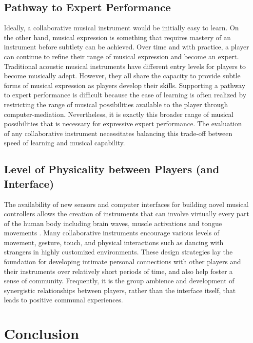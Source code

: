 \subsection{Pathway to Expert Performance}

Ideally, a collaborative musical instrument would be initially easy to learn. On
the other hand, musical expression is something that requires mastery of an
instrument before subtlety can be achieved. Over time and with practice, a player
can continue to refine their range of musical expression and become an expert. 
Traditional acoustic musical instruments  have different entry levels for players
to become musically adept.  However, they all share the capacity to provide
subtle forms of musical expression as players develop their skills. Supporting a
pathway to expert performance is difficult because the ease of learning is often
realized by restricting the range of musical possibilities available to the
player through computer-mediation.  Nevertheless, it is exactly this broader
range of musical possibilities that is necessary for expressive expert
performance. The evaluation of any collaborative instrument necessitates
balancing this trade-off between speed of learning and musical capability.

\subsection{Level of Physicality between Players (and Interface)}

The availability of new sensors and computer interfaces for building novel
musical controllers allows the creation of instruments that can involve virtually
every part of the human body including brain waves, muscle activations \cite{Tanaka:2002} and
tongue movements \cite{Vogt:2002}.  Many collaborative instruments encourage various levels
of movement, gesture, touch, and physical interactions such as dancing with
strangers in highly customized environments. These design strategies lay the
foundation for developing intimate personal connections with other players and
their instruments over relatively short periods of time, and also help foster a
sense of community. Frequently, it is the group ambience and development of
synergistic relationships between players, rather than the interface itself, 
that leads to positive communal experiences.

\section{Conclusion}

